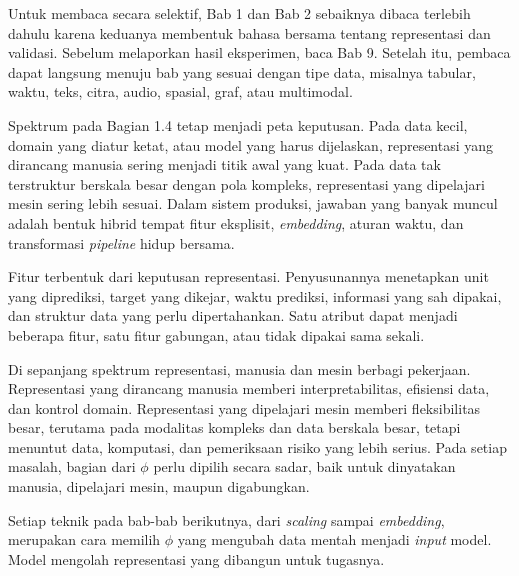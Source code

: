 Untuk membaca secara selektif, Bab 1 dan Bab 2 sebaiknya dibaca terlebih dahulu karena keduanya membentuk bahasa bersama tentang representasi dan validasi. Sebelum melaporkan hasil eksperimen, baca Bab 9. Setelah itu, pembaca dapat langsung menuju bab yang sesuai dengan tipe data, misalnya tabular, waktu, teks, citra, audio, spasial, graf, atau multimodal.

Spektrum pada Bagian 1.4 tetap menjadi peta keputusan. Pada data kecil, domain yang diatur ketat, atau model yang harus dijelaskan, representasi yang dirancang manusia sering menjadi titik awal yang kuat. Pada data tak terstruktur berskala besar dengan pola kompleks, representasi yang dipelajari mesin sering lebih sesuai. Dalam sistem produksi, jawaban yang banyak muncul adalah bentuk hibrid tempat fitur eksplisit, \emph{embedding}, aturan waktu, dan transformasi \emph{pipeline} hidup bersama.

\begin{sintesis}

Fitur terbentuk dari keputusan representasi. Penyusunannya menetapkan unit yang diprediksi, target yang dikejar, waktu prediksi, informasi yang sah dipakai, dan struktur data yang perlu dipertahankan. Satu atribut dapat menjadi beberapa fitur, satu fitur gabungan, atau tidak dipakai sama sekali.

Di sepanjang spektrum representasi, manusia dan mesin berbagi pekerjaan. Representasi yang dirancang manusia memberi interpretabilitas, efisiensi data, dan kontrol domain. Representasi yang dipelajari mesin memberi fleksibilitas besar, terutama pada modalitas kompleks dan data berskala besar, tetapi menuntut data, komputasi, dan pemeriksaan risiko yang lebih serius. Pada setiap masalah, bagian dari \(\phi\) perlu dipilih secara sadar, baik untuk dinyatakan manusia, dipelajari mesin, maupun digabungkan.

Setiap teknik pada bab-bab berikutnya, dari \emph{scaling} sampai \emph{embedding}, merupakan cara memilih \(\phi\) yang mengubah data mentah menjadi \emph{input} model. Model mengolah representasi yang dibangun untuk tugasnya.

\end{sintesis}

